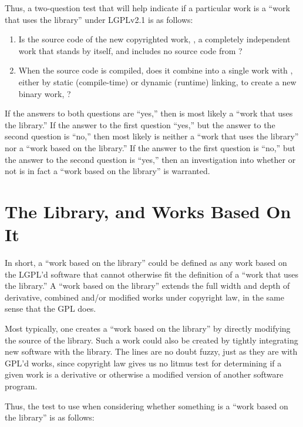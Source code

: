 Thus, a two-question test that will help indicate if a particular work is
a ``work that uses the library'' under LGPLv2.1 is as follows:

\begin{enumerate}

\item Is the source code of the new copyrighted work, \worki{}, a
  completely independent work that stands by itself, and includes no
  source code from \workl{}?

\item When the source code is compiled, does it combine into a single work
  with \workl{}, either by static (compile-time) or dynamic
  (runtime) linking, to create a new binary work, \lplusi{}?
\end{enumerate}

If the answers to both questions are ``yes,'' then \worki{} is most likely
a ``work that uses the library.''  If the answer to the first question
``yes,'' but the answer to the second question is ``no,'' then most likely
\worki{} is neither a ``work that uses the library'' nor a ``work based on
the library.''  If the answer to the first question is ``no,'' but the
answer to the second question is ``yes,'' then an investigation into
whether or not \worki{} is in fact a ``work based on the library'' is
warranted.

\section{The Library, and Works Based On It}

In short, a ``work based on the library'' could be defined as any
work based on the LGPL'd software that cannot otherwise fit the
definition of a ``work that uses the library.''  A ``work based on the
library'' extends the full width and depth of derivative, combined and/or
modified works under copyright law, in the same sense that the GPL does.

Most typically, one creates a ``work based on the library'' by directly
modifying the source of the library. Such a work could also be created by
tightly integrating new software with the library. The lines are no doubt
fuzzy, just as they are with GPL'd works, since copyright law gives us no
litmus test for determining if a given work is a derivative or otherwise a
modified version of another software program.

Thus, the test to use when considering whether something is a ``work
based on the library'' is as follows:


